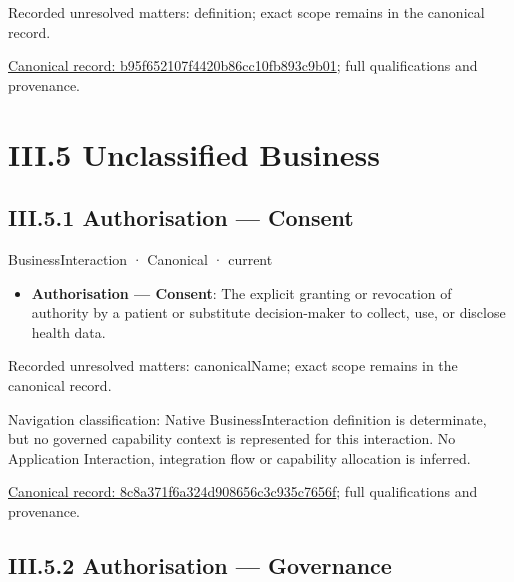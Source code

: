 {\small Recorded unresolved matters: definition; exact scope remains in the canonical record.}\par
{\footnotesize \href{../../../../continuum/business/business-service/b95f652107f4420b86cc10fb893c9b01.md}{Canonical record: b95f652107f4420b86cc10fb893c9b01}; full qualifications and provenance.}\par
\chapter*{III.5 Unclassified Business}
\label{navigation:III.5}

\section*{III.5.1 Authorisation — Consent}
\label{navigation:III.5.1}

\label{element:8c8a371f6a324d908656c3c935c7656f}
{\small BusinessInteraction · Canonical · current}\par

\begin{itemize}


\item \textbf{Authorisation — Consent}: The explicit granting or revocation of authority by a patient or substitute decision-maker to collect, use, or disclose health data.

\end{itemize}

{\small Recorded unresolved matters: canonicalName; exact scope remains in the canonical record.}\par
{\small Navigation classification: Native BusinessInteraction definition is determinate, but no governed capability context is represented for this interaction. No Application Interaction, integration flow or capability allocation is inferred.}\par
{\footnotesize \href{../../../../continuum/business/business-interaction/8c8a371f6a324d908656c3c935c7656f.md}{Canonical record: 8c8a371f6a324d908656c3c935c7656f}; full qualifications and provenance.}\par
\section*{III.5.2 Authorisation — Governance}
\label{navigation:III.5.2}

